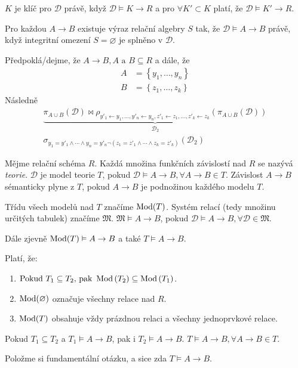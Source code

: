 $K$ je klíč pro $\mathcal{D}$ právě, když $\mathcal{D} \vDash K \to R$ a pro $\forall K' \subset K$ platí, že $\mathcal{D} \vDash K' \to R$.
\begin{upquote}
Pro každou $A \to B$ existuje výraz relační algebry $S$ tak, že $\mathcal{D} \vDash A \to B$ právě, když integritní omezení $S = \varnothing$ je splněno v $\mathcal{D}$.
\end{upquote}
\begin{upproof}
Předpoklá\-/dejme, že $A \to B, A \text{ a } B \subseteq R$ a dále, že
\begin{align*}
A &= \left\{ y_{1}, \ldots, y_{n} \right\} \\
B &= \left\{ z_{1}, \ldots, z_{k} \right\}
\end{align*}
Následně
\begin{gather*}
\underbrace{\pi_{A \cup B} (\mathcal{D}) \Join \rho_{y'_{1} \leftarrow y_{1}, \ldots, y'_{n} \leftarrow y_{n}, z'_{1} \leftarrow z_{1}, \ldots, z'_{k} \leftarrow z_{k}} \left(\pi_{A \cup B} (\mathcal{D})\right)}_{\mathcal{D}_{2}} \\
\sigma_{y_{1} = y'_{1} \land \cdots \land y_{n} = y'_{n} \lnot(z_{1} = z'_{1} \land \cdots \land z_{k} = z'_{k})} \left( \mathcal{D}_{2} \right)
\end{gather*}
\end{upproof}
\begin{uptheorem}
Mějme relační schéma $R$. Každá množina funkčních závislostí nad $R$ se nazývá \textit{teorie}. $\mathcal{D}$ je model teorie $T$, pokud $\mathcal{D} \vDash A \to B, \forall A \to B \in T$. Závislost $A \to B$ sémanticky plyne z $T$, pokud $A \to B$ je podnožinou každého modelu $T$.

Třídu všech modelů nad $T$ značíme $\operatorname{Mod}(T)$. Systém relací (tedy množinu určitých tabulek) značíme $\mathfrak{M}$. $\mathfrak{M} \vDash A \to B$, pokud $\mathcal{D} \vDash A \to B, \forall \mathcal{D} \in \mathfrak{M}$.

Dále zjevně $\operatorname{Mod}(T) \vDash A \to B$ a také $T \vDash A \to B$.
\end{uptheorem}
\begin{upquote}
Platí, že:
\begin{enumerate}
\item $\text{Pokud } T_{1} \subseteq T_{2} \text{, pak } \operatorname{Mod}\left( T_{2} \right) \subseteq \operatorname{Mod}\left( T_{1} \right)$.
\item $\operatorname{Mod}(\varnothing)$ označuje všechny relace nad $R$.
\item $\operatorname{Mod}(T)$ obsahuje vždy prázdnou relaci a všechny jednoprvkové relace.
\end{enumerate}
\end{upquote}
\begin{upquote}
Pokud $T_{1} \subseteq T_{2}$ a $T_{1} \vDash A \to B$, pak i $T_{2} \vDash A \to B$. $T \vDash A \to B, \forall A \to B \in T$.
\end{upquote}
Položme si fundamentální otázku, a sice zda $T \vDash A \to B$.

